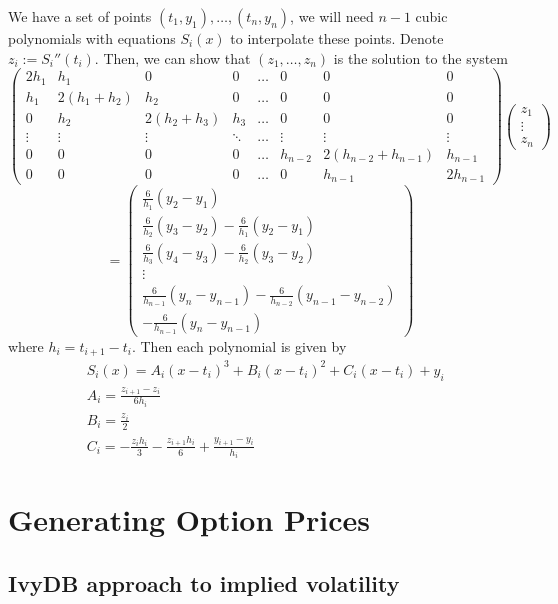 \documentclass[12pt]{article}
\begin{document}
We have a set of points $(t_1,y_1), \dots, (t_n, y_n)$, we will need $n - 1$ cubic polynomials with equations $S_i(x)$ to interpolate these points. Denote $z_i := S_{i}''(t_i)$. Then, we can show that $(z_1,\dots,z_n)$ is the solution to the system
\[\scriptscriptstyle\begin{pmatrix}
	2h_1 & h_1 & 0 & 0 & \dots & 0 & 0 & 0 \\
	h_1 & 2(h_1 + h_2) & h_2 & 0 & \dots & 0 & 0 & 0 \\
	0 & h_2 &  2(h_2 + h_3) & h_3 & \dots & 0 & 0 & 0 \\
	\vdots & \vdots & \vdots & \ddots & \dots & \vdots & \vdots & \vdots \\
	0 & 0 & 0 & 0 & \dots & h_{n-2} & 2(h_{n-2} + h_{n-1}) & h_{n-1} \\
	0 & 0 & 0 & 0 & \dots & 0 & h_{n-1} & 2h_{n-1}
\end{pmatrix}
\begin{pmatrix}
	z_1 \\ \vdots \\ z_n
\end{pmatrix}\]
\[\scriptscriptstyle=
\begin{pmatrix}
	\frac{6}{h_1}(y_2 - y_1) \\
	\frac{6}{h_2}(y_3 - y_2) - \frac{6}{h_1}(y_2-y_1) \\
	\frac{6}{h_3}(y_4 - y_3) - \frac{6}{h_2}(y_3-y_2) \\
	\vdots \\
	\frac{6}{h_{n-1}}(y_n - y_{n-1}) - \frac{6}{h_{n-2}}(y_{n-1}-y_{n-2}) \\
	-\frac{6}{h_{n-1}}(y_n-y_{n-1})
\end{pmatrix}\]
where $h_{i} = t_{i+1} - t_i$. Then each polynomial is given by
\[\begin{aligned}
	& S_i(x) = A_i(x-t_i)^3 + B_i(x-t_i)^2 + C_i(x-t_i) + y_i \\
	& A_i = \frac{z_{i+1} - z_i}{6h_i} \\
	& B_i = \frac{z_i}{2} \\
	& C_i = -\frac{z_ih_i}{3} - \frac{z_{i+1}h_i}{6} + \frac{y_{i+1}-y_i}{h_i}
\end{aligned}\]



\section{Generating Option Prices}

\subsection{IvyDB approach to implied volatility}
\end{document}
